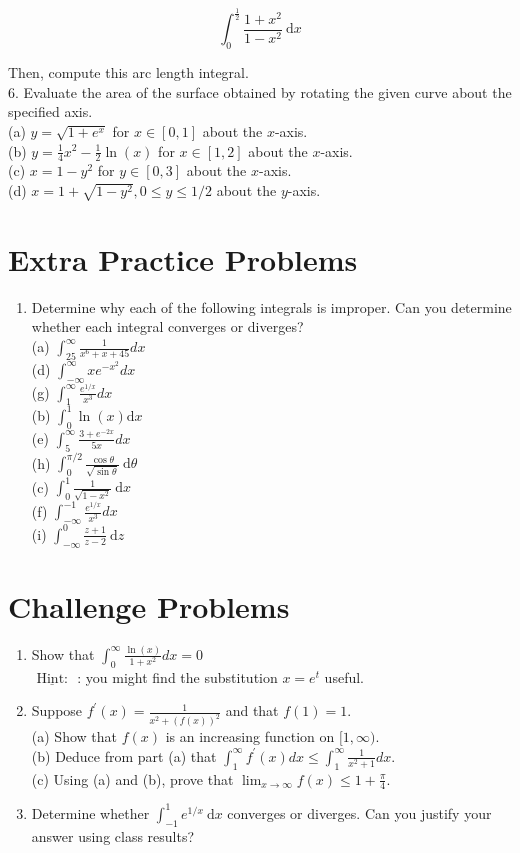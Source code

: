 \documentclass[10pt]{article}
\begin{document}
$$
\int_{0}^{\frac{1}{2}} \frac{1+x^{2}}{1-x^{2}} \mathrm{~d} x
$$

Then, compute this arc length integral.\\
6. Evaluate the area of the surface obtained by rotating the given curve about the specified axis.\\
(a) $y=\sqrt{1+e^{x}}$ for $x \in[0,1]$ about the $x$-axis.\\
(b) $y=\frac{1}{4} x^{2}-\frac{1}{2} \ln (x)$ for $x \in[1,2]$ about the $x$-axis.\\
(c) $x=1-y^{2}$ for $y \in[0,3]$ about the $x$-axis.\\
(d) $x=1+\sqrt{1-y^{2}}, 0 \leq y \leq 1 / 2$ about the $y$-axis.

\section*{Extra Practice Problems}
\begin{enumerate}
  \item Determine why each of the following integrals is improper. Can you determine whether each integral converges or diverges?\\
(a) $\int_{25}^{\infty} \frac{1}{x^{6}+x+45} d x$\\
(d) $\int_{-\infty}^{\infty} x e^{-x^{2}} d x$\\
(g) $\int_{1}^{\infty} \frac{e^{1 / x}}{x^{3}} d x$\\
(b) $\int_{0}^{1} \ln (x) \mathrm{d} x$\\
(e) $\int_{5}^{\infty} \frac{3+e^{-2 x}}{5 x} d x$\\
(h) $\int_{0}^{\pi / 2} \frac{\cos \theta}{\sqrt{\sin \theta}} \mathrm{~d} \theta$\\
(c) $\int_{0}^{1} \frac{1}{\sqrt{1-x^{2}}} \mathrm{~d} x$\\
(f) $\int_{-\infty}^{-1} \frac{e^{1 / x}}{x^{3}} d x$\\
(i) $\int_{-\infty}^{0} \frac{z+1}{z-2} \mathrm{~d} z$
\end{enumerate}

\section*{Challenge Problems}
\begin{enumerate}
  \item Show that $\int_{0}^{\infty} \frac{\ln (x)}{1+x^{2}} d x=0$\\
$\underline{\text { Hint: }}$ : you might find the substitution $x=e^{t}$ useful.
  \item Suppose $f^{\prime}(x)=\frac{1}{x^{2}+(f(x))^{2}}$ and that $f(1)=1$.\\
(a) Show that $f(x)$ is an increasing function on $[1, \infty)$.\\
(b) Deduce from part (a) that $\int_{1}^{\infty} f^{\prime}(x) d x \leq \int_{1}^{\infty} \frac{1}{x^{2}+1} d x$.\\
(c) Using (a) and (b), prove that $\lim _{x \rightarrow \infty} f(x) \leq 1+\frac{\pi}{4}$.
  \item Determine whether $\int_{-1}^{1} e^{1 / x} \mathrm{~d} x$ converges or diverges. Can you justify your answer using class results?
\end{enumerate}
\end{document}

